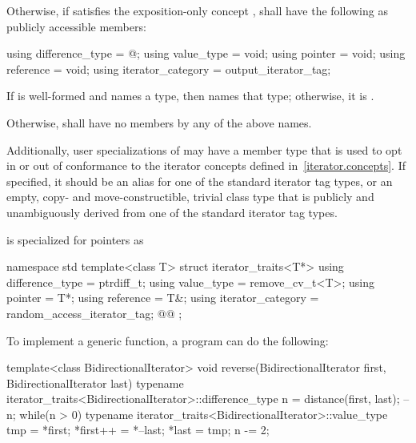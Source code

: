 \begin{itemize}
{\item
Otherwise, if  satisfies the exposition-only concept
,  shall
have the following as publicly accessible members:
\begin{codeblock}
  using difference_type   = @\seebelownc@;
  using value_type        = void;
  using pointer           = void;
  using reference         = void;
  using iterator_category = output_iterator_tag;
\end{codeblock}
If  is well-formed
and names a type, then  names that type; otherwise, it is
.
} %

\item
Otherwise, 
shall have no members by any of the above names.
\end{itemize}

{\color{newclr}
\pnum
Additionally, user specializations of  may have a member
type  that is used to opt in or out of conformance to the
iterator concepts defined in~\ref{iterator.concepts}. If specified, it should be
an alias for one of the standard iterator tag types,
or an empty, copy- and move-constructible, trivial class type that is publicly
and unambiguously derived from one of the standard iterator tag types.
} %

\pnum
{} is specialized for pointers as

\begin{codeblock}
namespace std {
  template<class T> struct iterator_traits<T*> {
    using difference_type   = ptrdiff_t;
    using value_type        = remove_cv_t<T>;
    using pointer           = T*;
    using reference         = T&;
    using iterator_category = random_access_iterator_tag;
    @\newtxt{ }\newtxt{ }@
  };
}
\end{codeblock}

\pnum
\begin{example}
To implement a generic
function, a \Cpp{} program can do the following:

\begin{codeblock}
template<class BidirectionalIterator>
void reverse(BidirectionalIterator first, BidirectionalIterator last) {
  typename iterator_traits<BidirectionalIterator>::difference_type n =
    distance(first, last);
  --n;
  while(n > 0) {
    typename iterator_traits<BidirectionalIterator>::value_type
     tmp = *first;
    *first++ = *--last;
    *last = tmp;
    n -= 2;
  }
}
\end{codeblock}
\end{example}


